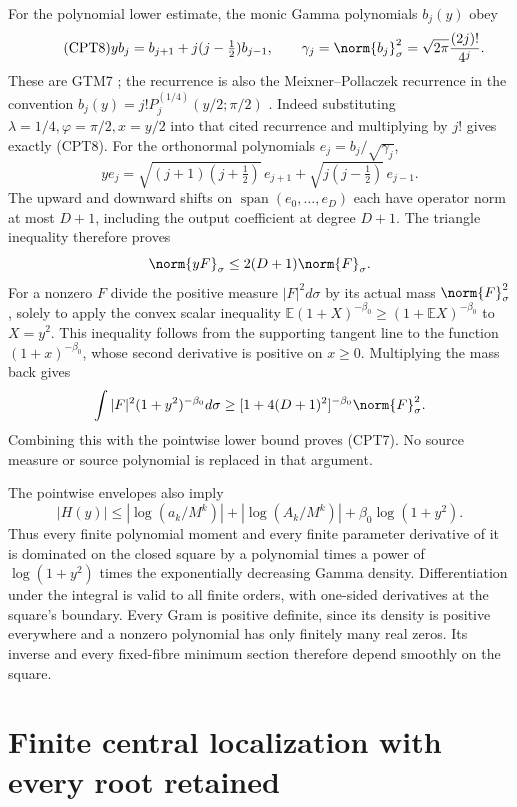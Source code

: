 \documentclass[11pt,a4paper]{article}
\begin{document}
For the polynomial lower estimate, the monic Gamma polynomials
\(b_j(y)\) obey
\begin{equation}\tag{CPT8}
 yb_j=b_{j+1}+j(j-\tfrac12)b_{j-1},\qquad
 \gamma_j=\norm{b_j}_\sigma^2
 =\sqrt{2\pi}\frac{(2j)!}{4^j}.
\end{equation}
These are GTM7 \cite{cpt:providers}; the recurrence is also the
Meixner--Pollaczek recurrence in the convention
\(b_j(y)=j!P_j^{(1/4)}(y/2;\pi/2)\)
\cite[(18.22.8)]{cpt:dlmfMP}.  Indeed substituting
\(\lambda=1/4,\varphi=\pi/2,x=y/2\) into that cited recurrence and
multiplying by \(j!\) gives exactly (CPT8).
For the orthonormal polynomials \(e_j=b_j/\sqrt{\gamma_j}\),
\[
 ye_j=\sqrt{(j+1)(j+\tfrac12)}\,e_{j+1}
       +\sqrt{j(j-\tfrac12)}\,e_{j-1}.
\]
The upward and downward shifts on
\(\operatorname{span}(e_0,\ldots,e_D)\) each have operator norm at
most \(D+1\), including the output coefficient at degree \(D+1\).
The triangle inequality therefore proves
\[
 \norm{yF}_\sigma\le2(D+1)\norm{F}_\sigma.
\]
For a nonzero \(F\) divide the positive measure
\(|F|^2d\sigma\) by its actual mass \(\norm{F}_\sigma^2\), solely
to apply the convex scalar inequality
\(\mathbb E(1+X)^{-\beta_0}\ge(1+\mathbb EX)^{-\beta_0}\)
to \(X=y^2\).  This inequality follows from the supporting tangent
line to the function \((1+x)^{-\beta_0}\), whose second derivative
is positive on \(x\ge0\).  Multiplying the mass back gives
\[
 \int |F|^2(1+y^2)^{-\beta_0}d\sigma
 \ge[1+4(D+1)^2]^{-\beta_0}\norm{F}_\sigma^2.
\]
Combining this with the pointwise lower bound proves (CPT7).
No source measure or source polynomial is replaced in that argument.

The pointwise envelopes also imply
\[
 |H(y)|\le
 |\log(a_k/M^k)|+|\log(A_k/M^k)|
       +\beta_0\log(1+y^2).
\]
Thus every finite polynomial moment and every finite parameter
derivative of it is dominated on the closed square by a polynomial
times a power of \(\log(1+y^2)\) times the exponentially decreasing
Gamma density.  Differentiation under the integral is valid to all
finite orders, with one-sided derivatives at the square's boundary.
Every Gram is positive definite, since its density is positive
everywhere and a nonzero polynomial has only finitely many real
zeros.  Its inverse and every fixed-fibre minimum section therefore
depend smoothly on the square.

\section{Finite central localization with every root retained}
\label{cpt:sec:localization}
\end{document}
